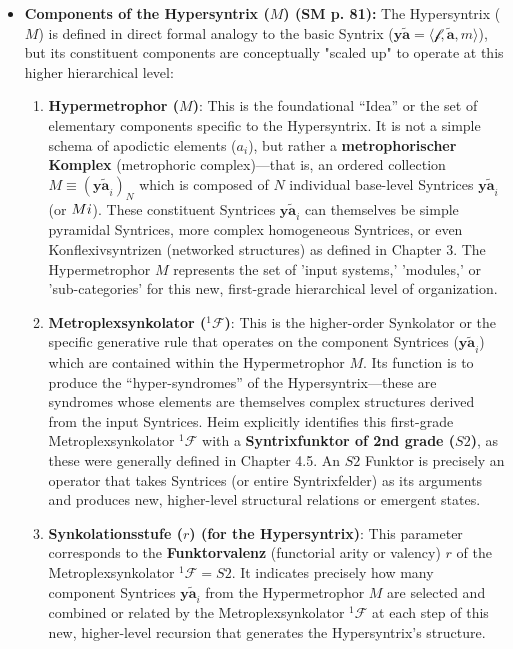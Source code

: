 \documentclass[12pt]{article}
\newcommand{\q}[1]{\enquote{#1}}
\newcommand{\syntrix}{\bm{y\widetilde{a}}}
\newcommand{\metrophor}{\bm{\widetilde{a}}}
\newcommand{\synkolator}{\mathcal{f}}
\newcommand{\synkolationsstufe}{m}
\def\metroplex#1#2{M}%
\newcommand{\hypersyntrix}{\metroplex{1}{F}}
\newcommand{\hypermetrophor}[1]{%
  \metroplex{#1}{a}%
}
\newcommand{\metroplexsynkolator}[1]{{}^{#1}\mathcal{F}}
\begin{document}
\begin{itemize}
    \item \textbf{Components of the Hypersyntrix (\(\hypersyntrix\)) (SM p. 81):}
    The Hypersyntrix (\(\hypersyntrix\)) is defined in direct formal analogy to the basic Syntrix (\( \syntrix = \langle \synkolator, \metrophor, \synkolationsstufe \rangle \)), but its constituent components are conceptually "scaled up" to operate at this higher hierarchical level:
    \begin{enumerate}
        \item \textbf{Hypermetrophor (\( \hypermetrophor{1} \))}: This is the foundational \q{Idea} or the set of elementary components specific to the Hypersyntrix. It is not a simple schema of apodictic elements (\(a_i\)), but rather a \textbf{metrophorischer Komplex} (metrophoric complex)—that is, an ordered collection \( \hypermetrophor{1} \equiv (\syntrix_i)_N \) which is composed of \( N \) individual base-level Syntrices \( \syntrix_i \) (or \(\metroplex{0}_i\)). These constituent Syntrices \( \syntrix_i \) can themselves be simple pyramidal Syntrices, more complex homogeneous Syntrices, or even Konflexivsyntrizen (networked structures) as defined in Chapter 3. The Hypermetrophor \( \hypermetrophor{1} \) represents the set of 'input systems,' 'modules,' or 'sub-categories' for this new, first-grade hierarchical level of organization.
        \item \textbf{Metroplexsynkolator (\( \metroplexsynkolator{1} \))}: This is the higher-order Synkolator or the specific generative rule that operates on the component Syntrices (\(\syntrix_i\)) which are contained within the Hypermetrophor \( \hypermetrophor{1} \). Its function is to produce the \q{hyper-syndromes} of the Hypersyntrix—these are syndromes whose elements are themselves complex structures derived from the input Syntrices. Heim explicitly identifies this first-grade Metroplexsynkolator \( \metroplexsynkolator{1} \) with a \textbf{Syntrixfunktor of 2nd grade (\( S2 \))}, as these were generally defined in Chapter 4.5. An \( S2 \) Funktor is precisely an operator that takes Syntrices (or entire Syntrixfelder) as its arguments and produces new, higher-level structural relations or emergent states.
        \item \textbf{Synkolationsstufe (\( r \)) (for the Hypersyntrix)}: This parameter corresponds to the \textbf{Funktorvalenz} (functorial arity or valency) \( r \) of the Metroplexsynkolator \( \metroplexsynkolator{1} = S2 \). It indicates precisely how many component Syntrices \( \syntrix_i \) from the Hypermetrophor \( \hypermetrophor{1} \) are selected and combined or related by the Metroplexsynkolator \( \metroplexsynkolator{1} \) at each step of this new, higher-level recursion that generates the Hypersyntrix's structure.
    \end{enumerate}


\end{itemize}
\end{document}

